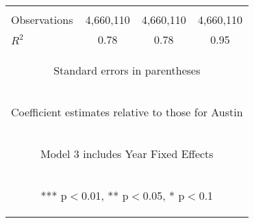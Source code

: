 \begin{center}
\begin{tabular}{lccc}
\vspace{4pt} & \begin{footnotesize}\end{footnotesize} & \begin{footnotesize}\end{footnotesize} & \begin{footnotesize}\end{footnotesize} \\
Observations & 4,660,110 & 4,660,110 & 4,660,110 \\
 $R^2$ & 0.78 & 0.78 & 0.95 \\ \hline
\multicolumn{4}{c}{\begin{footnotesize} Standard errors in parentheses\end{footnotesize}} \\
\multicolumn{4}{c}{\begin{footnotesize} Coefficient estimates relative to those for Austin\end{footnotesize}} \\
\multicolumn{4}{c}{\begin{footnotesize} Model 3 includes Year Fixed Effects\end{footnotesize}} \\
\multicolumn{4}{c}{\begin{footnotesize} *** p$<$0.01, ** p$<$0.05, * p$<$0.1\end{footnotesize}} \\
\end{tabular}
\end{center}
